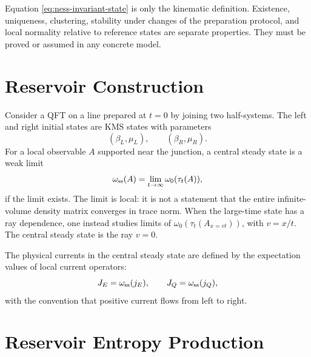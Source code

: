 Equation \eqref{eq:ness-invariant-state} is only the kinematic definition.
Existence, uniqueness, clustering, stability under changes of the preparation
protocol, and local normality relative to reference states are separate
properties.  They must be proved or assumed in any concrete model.

\section{Reservoir Construction}

Consider a QFT on a line prepared at \(t=0\) by joining two half-systems.
The left and right initial states are KMS states with parameters
\[
  (\beta_L,\mu_L),
  \qquad
  (\beta_R,\mu_R).
\]
For a local observable \(A\) supported near the junction, a central steady
state is a weak limit
\begin{equation}
  \omega_{\rm ss}(A)
  =
  \lim_{t\to\infty}\omega_0(\tau_t(A)),
  \label{eq:ness-local-weak-limit}
\end{equation}
if the limit exists.  The limit is local: it is not a statement that the
entire infinite-volume density matrix converges in trace norm.  When the
large-time state has a ray dependence, one instead studies limits of
\(\omega_0(\tau_t(A_{x=vt}))\), with \(v=x/t\).  The central steady state is
the ray \(v=0\).

The physical currents in the central steady state are defined by the
expectation values of local current operators:
\[
  J_E=\omega_{\rm ss}(j_E),
  \qquad
  J_Q=\omega_{\rm ss}(j_Q),
\]
with the convention that positive current flows from left to right.

\section{Reservoir Entropy Production}

